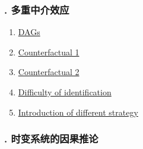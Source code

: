 \documentclass[11pt]{article}
\begin{document}
\vspace{-1cm}

\subsubsection*{. 多重中介效应}

\vspace{-0.5cm}

\begin{multicols}{2}
	\begin{enumerate}
		\item \href{https://mp.weixin.qq.com/s/6-TvJrRUcluUYCzGwgluKA}{DAGs}	%
		\item \href{https://mp.weixin.qq.com/s/RMfV5z9WIxsswops8HLKng}{Counterfactual 1}	%
		\item \href{https://mp.weixin.qq.com/s/EKEqsaAx_RmQDJlFy9vsmw}{Counterfactual 2}	%
		\item \href{https://mp.weixin.qq.com/s/5k5HY6pT6tnrAW4gFVRVKw}{Difficulty of identification}	%
		\item \href{https://mp.weixin.qq.com/s/n-mpLQk9pysPWUrSz26TVg}{Introduction of different strategy}	%
	\end{enumerate}
\end{multicols}


\vspace{-1cm}

\subsubsection*{. 时变系统的因果推论}

\vspace{-0.5cm}
\end{document}

